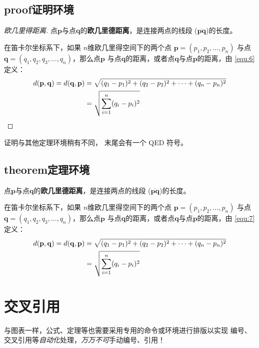 \subsection{proof证明环境}

\begin{proof}[欧几里得距离]
点$\mathbf{p}$与点$\mathbf{q}$的\textbf{欧几里德距离}，是连接两点的线段
($\overline{\mathbf{pq}}$)的长度。

在笛卡尔坐标系下，如果 $n$维欧几里得空间下的两个点 $\mathbf{p}=(p_1, p_2,
\dots, p_n)$ 与点$\mathbf{q} = (q_1, q_2, q_3, \dots, q_n)$，那么点$\mathbf{p}$
与点$\mathbf{q}$的距离，或者点$\mathbf{q}$与点$\mathbf{p}$的距离，由
\autoref{equ:6}定义：
\begin{align}
d(\mathbf{p},\mathbf{q}) = d(\mathbf{q},\mathbf{p}) & = \sqrt{(q_1-p_1)^2
                         + (q_2-p_2)^2 + \cdots + (q_n-p_n)^2} \notag \\
\label{equ:6}
& = \sqrt{\sum_{i=1}^n (q_i-p_i)^2}
\end{align}
\end{proof}

证明与其他定理环境稍有不同， 末尾会有一个 QED 符号。

\subsection{theorem定理环境}

\begin{theorem}[欧几里得距离]
点$\mathbf{p}$与点$\mathbf{q}$的\textbf{欧几里德距离}，是连接两点的线段
($\overline{\mathbf{pq}}$)的长度。

在笛卡尔坐标系下，如果 $n$维欧几里得空间下的两个点 $\mathbf{p}=(p_1, p_2,
\dots, p_n)$ 与点$\mathbf{q} = (q_1, q_2, q_3, \dots, q_n)$，那么点$\mathbf{p}$
与点$\mathbf{q}$的距离，或者点$\mathbf{q}$与点$\mathbf{p}$的距离，由
\autoref{equ:7}定义：
\begin{align}
d(\mathbf{p},\mathbf{q}) = d(\mathbf{q},\mathbf{p}) & = \sqrt{(q_1-p_1)^2
                         + (q_2-p_2)^2 + \cdots + (q_n-p_n)^2} \notag \\
\label{equ:7}
& = \sqrt{\sum_{i=1}^n (q_i-p_i)^2}
\end{align}
\end{theorem}


\section{交叉引用}

与图表一样，公式、定理等也需要采用专用的命令或环境进行排版以实现
编号、交叉引用等\emph{自动化}处理，\emph{万万不可}手动编号、引用！


